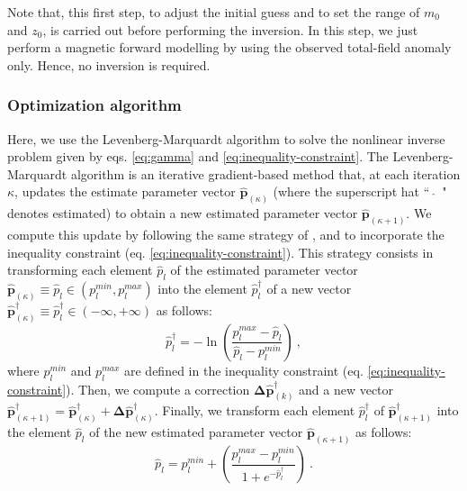 Note that, this first step, to adjust the initial guess and to set the range of $m_{0}$ and  $z_{0}$, is carried out before performing the inversion. 
In this step, we just perform a magnetic forward modelling by using the observed total-field anomaly only. 
Hence, no inversion is required.

\subsubsection{Optimization algorithm}

Here, we use the Levenberg-Marquardt algorithm \cite[e.g., ][ p. 240]{aster-etal2019} to solve the nonlinear inverse problem given by eqs. \ref{eq:gamma} and 
\ref{eq:inequality-constraint}.
The Levenberg-Marquardt algorithm is an iterative gradient-based method that, at each iteration $\kappa$, updates the estimate parameter vector $\hat{\mathbf{p}}_{(\kappa)}$ (where the superscript hat ``~$\hat{}$~" denotes estimated) to obtain a new estimated parameter vector $\hat{\mathbf{p}}_{(\kappa + 1)}$.
We compute this update by following the same strategy of \cite{barbosa-1999b}, \cite{oliveirajr-etal2011} and \cite{oliveirajr-barbosa2013} to incorporate the inequality constraint (eq. \ref{eq:inequality-constraint}). 
This strategy consists in transforming each element $\hat{p}_{l}$ of the estimated parameter vector $\hat{\mathbf{p}}_{(\kappa)} \equiv \hat{p}_{l} \in (p_{l}^{min}, p_{l}^{max}) $ 
into the element $\hat{p}^{\dagger}_{l}$ of a new vector 
$\hat{\mathbf{p}}^{\dagger}_{(\kappa)} \equiv \hat{p}^{\dagger}_{l} \in (- \infty, + \infty)$ 
as follows:
\begin{equation}\label{eq:inequality-function}
\hat{p}^{\dagger}_{l} = -\ln\left(\frac{p_{l}^{max} - \hat{p}_{l}}{\hat{p}_{l} - p_{l}^{min}}\right) \: ,
\end{equation}
where $p_{l}^{min}$ and $p_{l}^{max}$ are defined in the inequality constraint 
(eq. \ref{eq:inequality-constraint}).
Then, we compute a correction $\boldsymbol{\Delta}\hat{\mathbf{p}}^{\dagger}_{(k)}$ and a new vector 
$\hat{\mathbf{p}}^{\dagger}_{(\kappa+1)} = \hat{\mathbf{p}}^{\dagger}_{(\kappa)} + \boldsymbol{\Delta}\hat{\mathbf{p}}^{\dagger}_{(\kappa)}$.
Finally, we transform each element $\hat{p}^{\dagger}_{l}$ of 
$\hat{\mathbf{p}}^{\dagger}_{(\kappa+1)}$ into the element 
$\hat{p}_{l}$ of the new estimated parameter vector $\hat{\mathbf{p}}_{(\kappa+1)}$ as follows:
\begin{equation}\label{eq:inv-inequality-function}
\hat{p}_{l} = p_{l}^{min} + \left(\frac{p_{l}^{max} - p_{l}^{min}}{ 1 + e^{-\hat{p}^{\dagger}_{l}} }\right) \: .
\end{equation}


